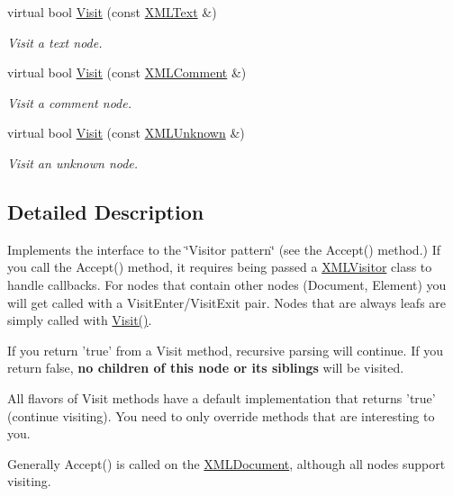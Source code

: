 \begin{DoxyCompactItemize}
virtual bool \hyperlink{classtinyxml2_1_1_x_m_l_visitor_af30233565856480ea48b6fa0d6dec65b}{Visit} (const \hyperlink{classtinyxml2_1_1_x_m_l_text}{X\-M\-L\-Text} \&)
\begin{DoxyCompactList}\small\item\em Visit a text node. \end{DoxyCompactList}\item 
virtual bool \hyperlink{classtinyxml2_1_1_x_m_l_visitor_acc8147fb5a85f6c65721654e427752d7}{Visit} (const \hyperlink{classtinyxml2_1_1_x_m_l_comment}{X\-M\-L\-Comment} \&)
\begin{DoxyCompactList}\small\item\em Visit a comment node. \end{DoxyCompactList}\item 
virtual bool \hyperlink{classtinyxml2_1_1_x_m_l_visitor_a14e4748387c34bf53d24e8119bb1f292}{Visit} (const \hyperlink{classtinyxml2_1_1_x_m_l_unknown}{X\-M\-L\-Unknown} \&)
\begin{DoxyCompactList}\small\item\em Visit an unknown node. \end{DoxyCompactList}\end{DoxyCompactItemize}


\subsection{Detailed Description}
Implements the interface to the \char`\"{}\-Visitor pattern\char`\"{} (see the Accept() method.) If you call the Accept() method, it requires being passed a \hyperlink{classtinyxml2_1_1_x_m_l_visitor}{X\-M\-L\-Visitor} class to handle callbacks. For nodes that contain other nodes (Document, Element) you will get called with a Visit\-Enter/\-Visit\-Exit pair. Nodes that are always leafs are simply called with \hyperlink{classtinyxml2_1_1_x_m_l_visitor_adc75bd459fc7ba8223b50f0616767f9a}{Visit()}.

If you return 'true' from a Visit method, recursive parsing will continue. If you return false, {\bfseries no children of this node or its siblings} will be visited.

All flavors of Visit methods have a default implementation that returns 'true' (continue visiting). You need to only override methods that are interesting to you.

Generally Accept() is called on the \hyperlink{classtinyxml2_1_1_x_m_l_document}{X\-M\-L\-Document}, although all nodes support visiting.

